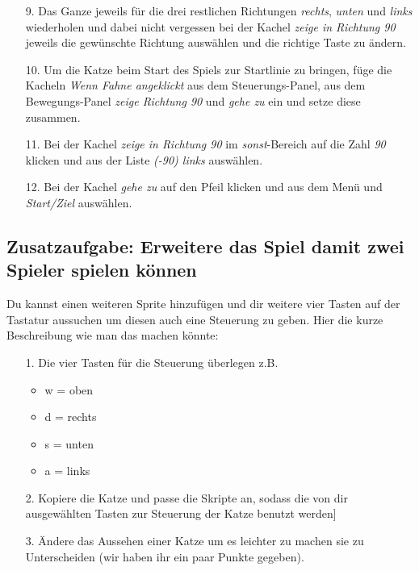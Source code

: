 \begin{itemize}
\item[9. ] Das Ganze jeweils für die drei restlichen Richtungen \textit{rechts}, \textit{unten} und \textit{links} wiederholen und dabei nicht vergessen bei der Kachel \textit{zeige in Richtung 90} jeweils die gewünschte Richtung auswählen und die richtige Taste zu ändern.
\end{itemize}


\begin{itemize}
\item[10. ] Um die Katze beim Start des Spiels zur Startlinie zu bringen, füge die Kacheln \textit{Wenn Fahne angeklickt} aus dem Steuerungs-Panel, aus dem Bewegungs-Panel \textit{zeige Richtung 90} und \textit{gehe zu} ein und setze diese zusammen.
\item[11. ] Bei der Kachel \textit{zeige in Richtung 90} im \textit{sonst}-Bereich auf die Zahl \textit{90} klicken und aus der Liste \textit{(-90) links} auswählen.
\item[12. ] Bei der Kachel \textit{gehe zu} auf den Pfeil klicken und aus dem Menü und \textit{Start/Ziel} auswählen.
\end{itemize}


\subsection{Zusatzaufgabe: Erweitere das Spiel damit zwei Spieler spielen können}
Du kannst einen weiteren Sprite hinzufügen und dir weitere vier Tasten auf der Tastatur aussuchen um diesen auch eine Steuerung zu geben. Hier die kurze Beschreibung wie man das machen könnte:
\begin{itemize}
\item[1. ] Die vier Tasten für die Steuerung überlegen z.B.
  \begin{itemize}
  \item w = oben
  \item d = rechts
  \item s = unten
  \item a = links
\end{itemize}
\item[2. ] Kopiere die Katze und passe die Skripte an, sodass die von dir ausgewählten Tasten zur Steuerung der Katze benutzt werden]
  \item[3. ] Ändere das Aussehen einer Katze um es leichter zu machen sie zu Unterscheiden (wir haben ihr ein paar Punkte gegeben).
\end{itemize}

